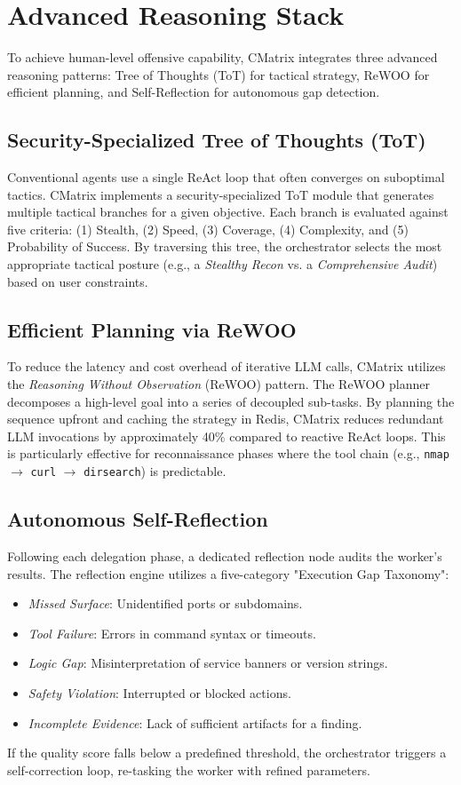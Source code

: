 \section{Advanced Reasoning Stack}
\label{sec:reasoning_stack}

To achieve human-level offensive capability, CMatrix integrates three advanced reasoning patterns: Tree of Thoughts (ToT) for tactical strategy, ReWOO for efficient planning, and Self-Reflection for autonomous gap detection.

\subsection{Security-Specialized Tree of Thoughts (ToT)}
Conventional agents use a single ReAct loop that often converges on suboptimal tactics. CMatrix implements a security-specialized ToT module that generates multiple tactical branches for a given objective. Each branch is evaluated against five criteria: (1) Stealth, (2) Speed, (3) Coverage, (4) Complexity, and (5) Probability of Success. By traversing this tree, the orchestrator selects the most appropriate tactical posture (e.g., a \textit{Stealthy Recon} vs. a \textit{Comprehensive Audit}) based on user constraints.

\subsection{Efficient Planning via ReWOO}
To reduce the latency and cost overhead of iterative LLM calls, CMatrix utilizes the \textit{Reasoning Without Observation} (ReWOO) pattern. The ReWOO planner decomposes a high-level goal into a series of decoupled sub-tasks. By planning the sequence upfront and caching the strategy in Redis, CMatrix reduces redundant LLM invocations by approximately 40\% compared to reactive ReAct loops. This is particularly effective for reconnaissance phases where the tool chain (e.g., \texttt{nmap} $\to$ \texttt{curl} $\to$ \texttt{dirsearch}) is predictable.

\subsection{Autonomous Self-Reflection}
Following each delegation phase, a dedicated reflection node audits the worker's results. The reflection engine utilizes a five-category "Execution Gap Taxonomy":
\begin{itemize}
    \item \textit{Missed Surface}: Unidentified ports or subdomains.
    \item \textit{Tool Failure}: Errors in command syntax or timeouts.
    \item \textit{Logic Gap}: Misinterpretation of service banners or version strings.
    \item \textit{Safety Violation}: Interrupted or blocked actions.
    \item \textit{Incomplete Evidence}: Lack of sufficient artifacts for a finding.
\end{itemize}
If the quality score falls below a predefined threshold, the orchestrator triggers a self-correction loop, re-tasking the worker with refined parameters.

